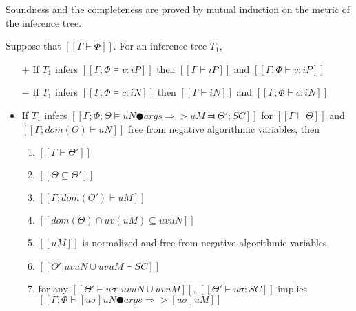 Soundness and the completeness are proved by mutual induction on
the metric of the inference tree.

\begin{lemma} \label{lemma:typing-soundness}
    Suppose that $[[Γ ⊢ Φ]]$.
    For an inference tree $T_1$,
    \hfill
    \begin{itemize}
        \item [$+$] If $T_1$ infers $[[Γ; Φ ⊨ v : iP]]$ then $[[Γ ⊢ iP]]$ and $[[Γ; Φ ⊢ v : iP]]$
        \item [$-$] If $T_1$ infers $[[Γ; Φ ⊨ c : iN]]$ then $[[Γ ⊢ iN]]$ and $[[Γ; Φ ⊢ c : iN]]$
        \item  If $T_1$ infers $[[Γ; Φ; Θ ⊨ uN ● args ⇒> uM ⫤ Θ'; SC]]$
                for $[[Γ ⊢ Θ]]$ and $[[Γ; dom(Θ) ⊢  uN]]$ free from negative algorithmic variables, 
                then
            \begin{enumerate}
                \item $[[Γ ⊢ Θ']]$
                \item $[[Θ ⊆ Θ']]$
                \item $[[Γ; dom(Θ') ⊢  uM]]$
                \item $[[dom(Θ) ∩ uv(uM) ⊆ uv uN]]$
                \item $[[uM]]$ is normalized and free from negative algorithmic variables
                \item $[[Θ'|uv uN ∪ uv uM ⊢ SC]]$
                \item for any $[[ Θ' ⊢ uσ : uv uN ∪ uv uM ]]$,
                    $[[ Θ' ⊢ uσ : SC ]]$ implies $[[ Γ ; Φ ⊢ [uσ]uN ● args ⇒> [uσ]uM ]]$
            \end{enumerate}
    \end{itemize}
\end{lemma}
